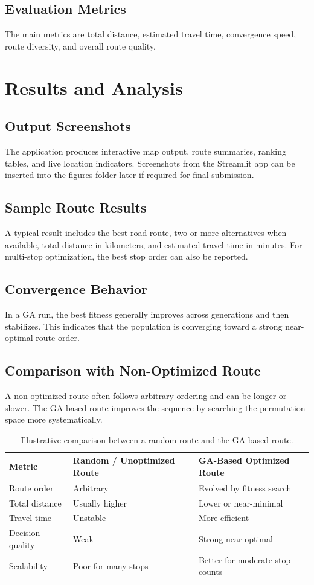 \subsection{Evaluation Metrics}
The main metrics are total distance, estimated travel time, convergence speed, route diversity, and overall route quality.

\section{Results and Analysis}
\subsection{Output Screenshots}
The application produces interactive map output, route summaries, ranking tables, and live location indicators. Screenshots from the Streamlit app can be inserted into the figures folder later if required for final submission.

\subsection{Sample Route Results}
A typical result includes the best road route, two or more alternatives when available, total distance in kilometers, and estimated travel time in minutes. For multi-stop optimization, the best stop order can also be reported.

\subsection{Convergence Behavior}
In a GA run, the best fitness generally improves across generations and then stabilizes. This indicates that the population is converging toward a strong near-optimal route order.

\subsection{Comparison with Non-Optimized Route}
A non-optimized route often follows arbitrary ordering and can be longer or slower. The GA-based route improves the sequence by searching the permutation space more systematically.

\begin{table}[H]
\centering
\caption{Illustrative comparison between a random route and the GA-based route.}
\label{tab:comparison}
\begin{tabularx}{\textwidth}{lXX}
\toprule
Metric & Random / Unoptimized Route & GA-Based Optimized Route \\
\midrule
Route order & Arbitrary & Evolved by fitness search \\
Total distance & Usually higher & Lower or near-minimal \\
Travel time & Unstable & More efficient \\
Decision quality & Weak & Strong near-optimal \\
Scalability & Poor for many stops & Better for moderate stop counts \\
\bottomrule
\end{tabularx}
\end{table}

